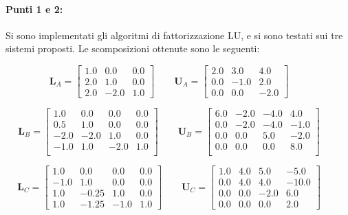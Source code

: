 \documentclass[letterpaper, 12pt]{article}
\numberwithin{equation}{section}    %
\begin{document}
\paragraph{Punti 1 e 2:} Si sono implementati gli algoritmi di fattorizzazione LU, e si sono testati 
sui tre sistemi proposti. Le scomposizioni ottenute sono le seguenti: 
\begin{center}
    \[
    \mathbf{L}_A =
    \begin{bmatrix}
    1.0  & 0.0 & 0.0 \\
    2.0  & 1.0 & 0.0 \\
    2.0  & -2.0 & 1.0
    \end{bmatrix}
    \qquad
    \mathbf{U}_A =
    \begin{bmatrix}
    2.0 &  3.0  & 4.0 \\
    0.0  & -1.0  & 2.0 \\
    0.0  & 0.0   & -2.0
    \end{bmatrix}
    \qquad
    \]

    \[
    \mathbf{L}_B =
    \begin{bmatrix}
    1.0  & 0.0   & 0.0  & 0.0 \\
    0.5  & 1.0   & 0.0  & 0.0 \\
    -2.0  & -2.0  & 1.0  & 0.0 \\
    -1.0  & 1.0   & -2.0 & 1.0 \\
    \end{bmatrix}
    \qquad
    \mathbf{U}_B =
    \begin{bmatrix}
    6.0  & -2.0  & -4.0  & 4.0  \\
    0.0  & -2.0  & -4.0  & -1.0 \\
    0.0  & 0.0   & 5.0   & -2.0 \\
    0.0  & 0.0   & 0.0   & 8.0  \\
    \end{bmatrix}
    \qquad
    \]

    \[
    \mathbf{L}_C =
    \begin{bmatrix}
    1.0  & 0.0   & 0.0  & 0.0 \\
    -1.0  & 1.0   & 0.0  & 0.0 \\
    1.0  & -0.25 & 1.0  & 0.0 \\
    1.0  & -1.25 & -1.0 & 1.0 
    \end{bmatrix}
    \qquad
    \mathbf{U}_C =
    \begin{bmatrix}
    1.0  & 4.0   & 5.0  & -5.0 \\
    0.0  & 4.0   & 4.0  & -10.0 \\
    0.0  & 0.0   & -2.0 & 6.0 \\
    0.0  & 0.0   & 0.0  & 2.0 
    \end{bmatrix}
    \qquad
    \]
\end{center}
\end{document}
